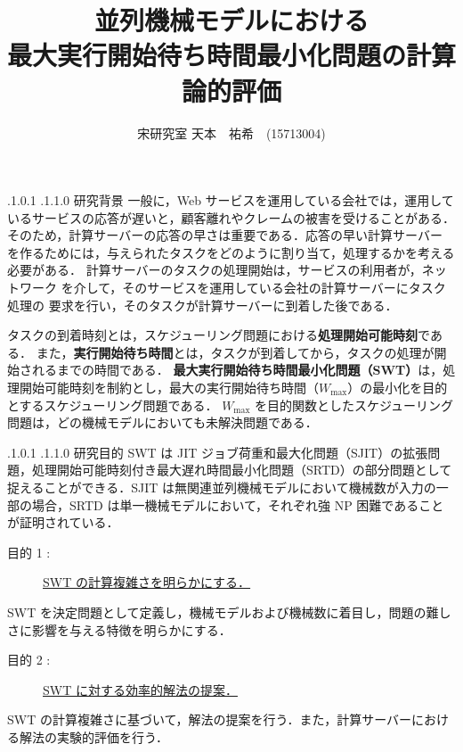 \documentclass[oneside, 10pt, twocolumn]{jarticle}
\title{\bf{\rm
並列機械モデルにおける\\最大実行開始待ち時間最小化問題の計算論的評価}}
\author{宋研究室
\hspace{15pt}
天本　祐希　(15713004)}
\date{}
\makeatletter
\def\section{\@startsection {section}{1}{\z@}{-3.5ex plus -1ex minus
-.2ex}{2.3 ex plus .2ex}{\large\bf}}
\renewcommand{\section}{
\@startsection{section}{1}{\z@}
{.1\Cvs \@plus.0\Cdp \@minus.1\Cdp}%
{.1\Cvs \@plus.1\Cdp \@minus.0\Cdp}%
{\reset@font\large\bfseries}}      %
\makeatother
\begin{document}
\maketitle
\thispagestyle{empty}
\section{研究背景}
一般に，Web サービスを運用している会社では，運用しているサービスの応答が遅いと，顧客離れやクレームの被害を受けることがある．
そのため，計算サーバーの応答の早さは重要である．応答の早い計算サーバー
を作るためには，与えられたタスクをどのように割り当て，処理するかを考える必要がある．
計算サーバーのタスクの処理開始は，サービスの利用者が，ネットワーク
を介して，そのサービスを運用している会社の計算サーバーにタスク処理の
要求を行い，そのタスクが計算サーバーに到着した後である．

タスクの到着時刻とは，スケジューリング問題における{\bf 処理開始可能時刻}である．
また，{\bf 実行開始待ち時間}とは，タスクが到着してから，タスクの処理が開始されるまでの時間である．
{\bf 最大実行開始待ち時間最小化問題（SWT）}は，処理開始可能時刻を制約とし，最大の実行開始待ち時間（\mbox{\boldmath $W_{\max}$}）の最小化を目的とするスケジューリング問題である．
$W_{\max}$ を目的関数としたスケジューリング問題は，どの機械モデルにおいても未解決問題である．


\section{研究目的}
SWT は JIT ジョブ荷重和最大化問題（SJIT）の拡張問題，処理開始可能時刻付き最大遅れ時間最小化問題（SRTD）の部分問題として捉えることができる．SJIT は無関連並列機械モデルにおいて機械数が入力の一部の場合，SRTD は単一機械モデルにおいて，それぞれ強 NP 困難であることが証明されている\cite{SJIT}\cite{SRTD}．
\begin{description}
  \item[目的 1 :]
  \underline{SWT の計算複雑さを明らかにする．}
\end{description}
SWT を決定問題として定義し，機械モデルおよび機械数に着目し，問題の難しさに影響を与える特徴を明らかにする．

\begin{description}
  \item[目的 2 :]
  \underline{SWT に対する効率的解法の提案．}
\end{description}
SWT の計算複雑さに基づいて，解法の提案を行う．また，計算サーバーにおける解法の実験的評価を行う．
\end{document}
